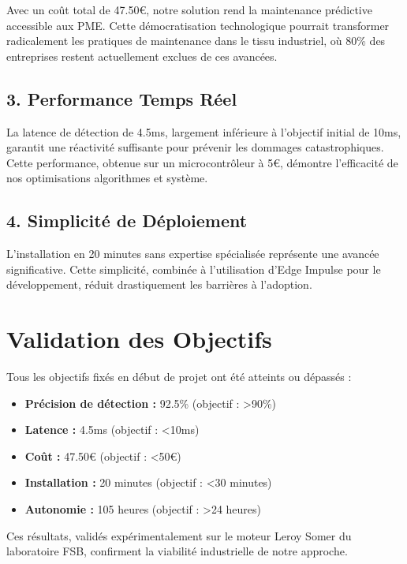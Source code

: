 Avec un coût total de 47.50€, notre solution rend la maintenance prédictive accessible aux PME. Cette démocratisation technologique pourrait transformer radicalement les pratiques de maintenance dans le tissu industriel, où 80\% des entreprises restent actuellement exclues de ces avancées.

\subsection*{3. Performance Temps Réel}

La latence de détection de 4.5ms, largement inférieure à l'objectif initial de 10ms, garantit une réactivité suffisante pour prévenir les dommages catastrophiques. Cette performance, obtenue sur un microcontrôleur à 5€, démontre l'efficacité de nos optimisations algorithmes et système.

\subsection*{4. Simplicité de Déploiement}

L'installation en 20 minutes sans expertise spécialisée représente une avancée significative. Cette simplicité, combinée à l'utilisation d'Edge Impulse pour le développement, réduit drastiquement les barrières à l'adoption.

\section*{Validation des Objectifs}

Tous les objectifs fixés en début de projet ont été atteints ou dépassés :

\begin{itemize}
    \item \textbf{Précision de détection :} 92.5\% (objectif : >90\%)
    \item \textbf{Latence :} 4.5ms (objectif : <10ms)
    \item \textbf{Coût :} 47.50€ (objectif : <50€)
    \item \textbf{Installation :} 20 minutes (objectif : <30 minutes)
    \item \textbf{Autonomie :} 105 heures (objectif : >24 heures)
\end{itemize}

Ces résultats, validés expérimentalement sur le moteur Leroy Somer du laboratoire FSB, confirment la viabilité industrielle de notre approche.

